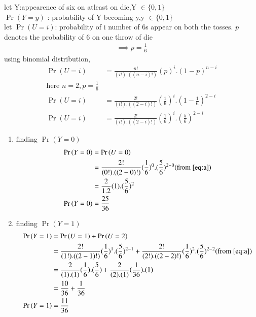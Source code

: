 \documentclass[journal,12pt,onecolumn]{IEEEtran}
\providecommand{\pr}[1]{\ensuremath{\Pr\left(#1\right)}}
\theoremstyle{remark}
\begin{document}
\begin{enumerate}
let Y:appearence of six on atleast on die,Y $\in \{ 0,1\}$ \\
$\pr{Y=y}$ : probability of Y becoming y,y $\in \{ 0,1\}$\\
let $\pr{U=i}$: probability of i number of 6s appear on both the tosses.
$p$ denotes the probability of 6 on one throw of die 
\begin{align}
\implies p=\frac{1}{6} 
\end{align}
using binomial distribution,
\begin{align}
\pr{U=i}&=\frac{n!}{(i!).((n-i)!)}(p)^i.(1-p)^{n-i}\\
\text{here } n=2,p=\frac{1}{6} \\
\pr{U=i}&=\frac{2!}{(i!).((2-i)!)}(\frac{1}{6})^i.(1-\frac{1}{6})^{2-i}\\
\pr{U=i}&=\frac{2!}{(i!).((2-i)!)}(\frac{1}{6})^i.(\frac{5}{6})^{2-i} \label{eq:a}
\end{align} 
\begin{enumerate}
\item finding $\pr{Y=0}$
\begin{align}
\pr{Y=0}&=\pr{U=0}\\
&=\frac{2!}{(0!).((2-0)!)}(\frac{1}{6})^0.(\frac{5}{6})^{2-0} (\text{from } \eqref{eq:a})\\
&=\frac{2}{1.2}(1).(\frac{5}{6})^{2}\\
\pr{Y=0}&=\frac{25}{36}
\end{align}
\item finding $\pr{Y=1}$
\begin{align}
\pr{Y=1}&= \pr{U=1}+\pr{U=2}\\
&=\frac{2!}{(1!).((2-1)!)}(\frac{1}{6})^1.(\frac{5}{6})^{2-1}+\frac{2!}{(2!).((2-2)!)}(\frac{1}{6})^2.(\frac{5}{6})^{2-2} (\text{from }\eqref{eq:a})\\
&=\frac{2}{(1).(1)}(\frac{1}{6}).(\frac{5}{6})+\frac{2}{(2).(1)}(\frac{1}{36}).(1)  \\
&=\frac{10}{36}+\frac{1}{36}\\
\pr{Y=1}&=\frac{11}{36}
\end{align}
\end{enumerate}
\end{enumerate}
\end{document}
